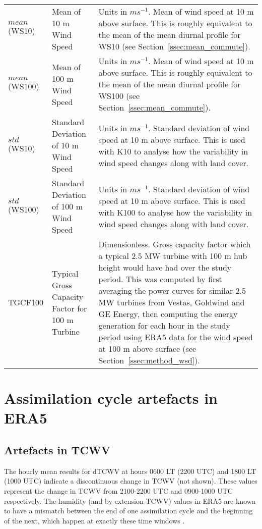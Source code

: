 \begin{landscape}
\begin{longtable}{P{2cm}P{3cm}P{13cm}}
		$mean$(\acs{WS10}) & Mean of 10 m Wind Speed & Units in $m s^{-1}$. Mean of wind speed at 10 m above surface. This is roughly equivalent to the mean of the mean diurnal profile for \ac{WS10} (see Section~\ref{ssec:mean_commute}). \\
		$mean$(\acs{WS100}) & Mean of 100 m Wind Speed & Units in $m s^{-1}$. Mean of wind speed at 10 m above surface. This is roughly equivalent to the mean of the mean diurnal profile for \ac{WS100} (see Section~\ref{ssec:mean_commute}). \\
		$std$(\acs{WS10}) & Standard Deviation of 10 m Wind Speed & Units in $m s^{-1}$. Standard deviation of wind speed at 10 m above surface. This is used with \ac{K10} to analyse how the variability in wind speed changes along with land cover. \\
		$std$(\acs{WS100}) & Standard Deviation of 100 m Wind Speed & Units in $m s^{-1}$. Standard deviation of wind speed at 10 m above surface. This is used with \ac{K100} to analyse how the variability in wind speed changes along with land cover. \\
		\acs{TGCF100} & Typical Gross Capacity Factor for 100 m Turbine & Dimensionless. Gross capacity factor which a typical 2.5 MW turbine with 100 m hub height would have had over the study period. This was computed by first averaging the power curves for similar 2.5 MW turbines from Vestas, Goldwind and GE Energy, then computing the energy generation for each hour in the study period using \ac{ERA5} data for the wind speed at 100 m above surface (see Section~\ref{ssec:method_wsd}). \\ \bottomrule
	\end{longtable}
	
	\endgroup
\end{landscape}

\section{Assimilation cycle artefacts in ERA5}
\label{sec:artefact}

\subsection{Artefacts in TCWV}

The hourly mean results for \ac{dTCWV} at hours 0600 \ac{LT} (2200 UTC) and 1800 \ac{LT} (1000 UTC) indicate a discontinuous change in \ac{TCWV} (not shown). These values represent the change in \ac{TCWV} from 2100-2200 UTC and 0900-1000 UTC respectively. The humidity (and by extension \ac{TCWV}) values in ERA5 are known to have a mismatch between the end of one assimilation cycle and the beginning of the next, which happen at exactly these time windows \citep{ecmwf}.

